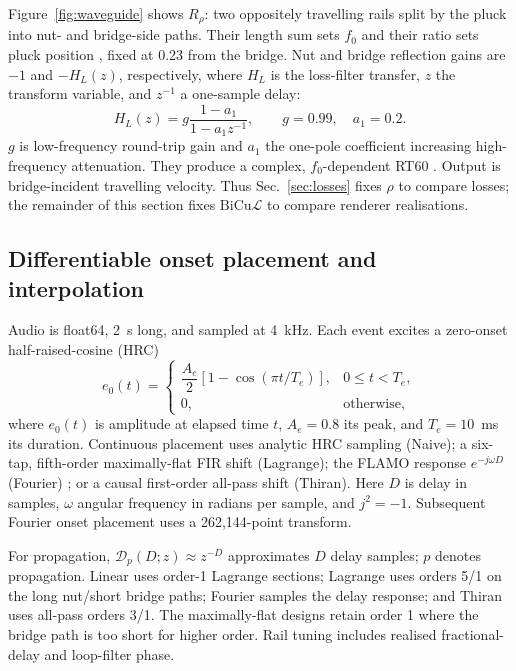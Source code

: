 \documentclass[conference]{IEEEtran}
\newcommand{\bicul}{\ensuremath{\mathrm{BiCu}\mathcal{L}}}
\begin{document}
Figure~\ref{fig:waveguide} shows $R_\rho$: two oppositely travelling rails split
by the pluck into nut- and bridge-side paths. Their length sum sets $f_0$ and
their ratio sets pluck position \cite{depaula2026waveguides}, fixed at 0.23
from the bridge. Nut and bridge reflection gains are $-1$ and $-H_L(z)$,
respectively, where $H_L$ is the loss-filter transfer, $z$ the transform
variable, and $z^{-1}$ a one-sample delay:
\begin{equation}
H_L(z)=g\frac{1-a_1}{1-a_1z^{-1}},\qquad g=0.99,\quad a_1=0.2.
\end{equation}
$g$ is low-frequency round-trip gain and $a_1$ the one-pole coefficient
increasing high-frequency attenuation. They produce a complex, $f_0$-dependent
RT60 \cite[Fig.~3]{tablasdepaula2026karplus}. Output is bridge-incident
travelling velocity. Thus Sec.~\ref{sec:losses} fixes $\rho$ to compare losses;
the remainder of this section fixes \bicul{} to compare renderer realisations.

\subsection{Differentiable onset placement and interpolation}
Audio is float64, 2~s long, and sampled at 4~kHz. Each event excites a zero-onset
half-raised-cosine (HRC)
\begin{equation}
e_0(t)=\begin{cases}
\dfrac{A_e}{2}[1-\cos(\pi t/T_e)],&0\leq t<T_e,\\
0,&\text{otherwise,}
\end{cases}
\end{equation}
where $e_0(t)$ is amplitude at elapsed time $t$, $A_e=0.8$ its peak, and
$T_e=10$~ms its duration. Continuous placement uses analytic HRC sampling
(Naive); a six-tap, fifth-order maximally-flat FIR shift (Lagrange); the FLAMO
response $e^{-j\omega D}$ (Fourier) \cite{dalsanto2025flamo}; or a causal
first-order all-pass shift (Thiran). Here $D$ is delay in samples, $\omega$
angular frequency in radians per sample, and $j^2=-1$. Subsequent Fourier onset
placement uses a 262,144-point transform.

For propagation, $\mathcal D_p(D;z)\approx z^{-D}$ approximates $D$ delay
samples; $p$ denotes propagation. Linear uses order-1 Lagrange sections;
Lagrange uses orders 5/1 on the long nut/short bridge paths; Fourier samples the
delay response; and Thiran uses all-pass orders 3/1. The maximally-flat designs
\cite{laakso1996splitting} retain order 1 where the bridge path is too short for
higher order. Rail tuning includes realised fractional-delay and loop-filter
phase.
\end{document}
